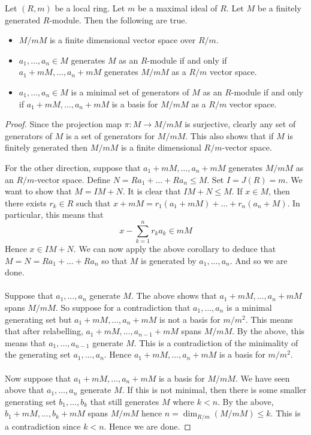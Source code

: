 \documentclass[a4paper]{article}
\begin{document}
\begin{crl}{}{} Let $(R,m)$ be a local ring. Let $m$ be a maximal ideal of $R$. Let $M$ be a finitely generated $R$-module. Then the following are true. 
\begin{itemize}
\item $M/mM$ is a finite dimensional vector space over $R/m$. 
\item $a_1,\dots,a_n\in M$ generates $M$ as an $R$-module if and only if $a_1+mM,\dots,a_n+mM$ generates $M/mM$ as a $R/m$ vector space. 
\item $a_1,\dots,a_n\in M$ is a minimal set of generators of $M$ as an $R$-module if and only if $a_1+mM,\dots,a_n+mM$ is a basis for $M/mM$ as a $R/m$ vector space. 
\end{itemize} 
\begin{proof}
Since the projection map $\pi:M\to M/mM$ is surjective, clearly any set of generators of $M$ is a set of generators for $M/mM$. This also shows that if $M$ is finitely generated then $M/mM$ is a finite dimensional $R/m$-vector space. 

For the other direction, suppose that $a_1+mM,\dots,a_n+mM$ generates $M/mM$ as an $R/m$-vector space. Define $N=Ra_1+\dots+Ra_n\leq M$. Set $I=J(R)=m$. We want to show that $M=IM+N$. It is clear that $IM+N\leq M$. If $x\in M$, then there exists $r_k\in R$ such that $x+mM=r_1(a_1+mM)+\dots+r_n(a_n+M)$. In particular, this means that $$x-\sum_{k=1}^nr_ka_k\in mM$$ Hence $x\in IM+N$. We can now apply the above corollary to deduce that $M=N=Ra_1+\dots+Ra_n$ so that $M$ is generated by $a_1,\dots,a_n$. And so we are done. \\~\\

Suppose that $a_1,\dots,a_n$ generate $M$. The above shows that $a_1+mM,\dots,a_n+mM$ spans $M/mM$. So suppose for a contradiction that $a_1,\dots,a_n$ is a minimal generating set but $a_1+mM,\dots,a_n+mM$ is not a basis for $m/m^2$. This means that after relabelling, $a_1+mM,\dots,a_{n-1}+mM$ spans $M/mM$. By the above, this means that $a_1,\dots,a_{n-1}$ generate $M$. This is a contradiction of the minimality of the generating set $a_1,\dots,a_n$. Hence $a_1+mM,\dots,a_n+mM$ is a basis for $m/m^2$. \\~\\

Now suppose that $a_1+mM,\dots,a_n+mM$ is a basis for $M/mM$. We have seen above that $a_1,\dots,a_n$ generate $M$. If this is not minimal, then there is some smaller generating set $b_1,\dots,b_k$ that still generates $M$ where $k<n$. By the above, $b_1+mM,\dots,b_k+mM$ spans $M/mM$ hence $n=\dim_{R/m}(M/mM)\leq k$. This is a contradiction since $k<n$. Hence we are done. 
\end{proof}
\end{crl}
\end{document}
